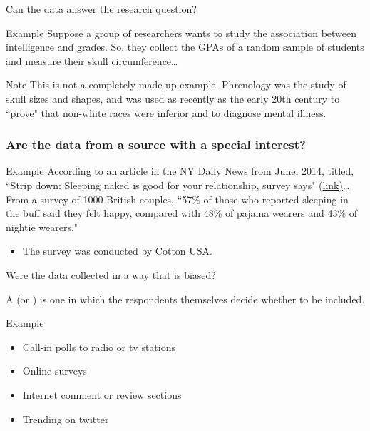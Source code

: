 \documentclass[xcolor=table, aspectratio=169, bigger, handout]{beamer}
\begin{document}
\begin{frame}{Can the data answer the research question?}

\begin{exampleblock}{Example}
Suppose a group of researchers wants to study the association between intelligence and grades. So, they collect the GPAs of a random sample of students and measure their skull circumference\ldots\\
\end{exampleblock}
\pause
\begin{alertblock}{Note}
This is not a completely made up example. Phrenology was the study of skull sizes and shapes, and was used as recently as the early 20th century to ``prove" that non-white races were inferior and to diagnose mental illness.
\end{alertblock}
\end{frame}

\begin{frame}
\frametitle{Are the data from a source with a special interest?}
\begin{exampleblock}{Example}
According to an article in the NY Daily News from June, 2014, titled, ``Strip down: Sleeping naked is good for your relationship, survey says" (\href{http://www.nydailynews.com/life-style/health/survey-sleeping-naked-good-relationships-article-1.1849491}{link)}\ldots\\
\medskip
From a survey of 1000 British couples, ``57\% of those who reported sleeping in the buff said they felt happy, compared with 48\% of pajama wearers and 43\% of nightie wearers."\\

\begin{itemize}
\pause\item The survey was conducted by Cotton USA.
\end{itemize}
\end{exampleblock}

\end{frame}

\begin{frame}{Were the data collected in a way that is biased?}

\begin{block}{}
A  (or ) is one in which the respondents themselves decide whether to be included. 
\end{block}

\pause
\begin{exampleblock}{Example}
\begin{itemize}
\item Call-in polls to radio or tv stations
\item Online surveys
\item Internet comment or review sections
\item Trending on twitter
\end{itemize}
\end{exampleblock}
\end{frame}
\end{document}
